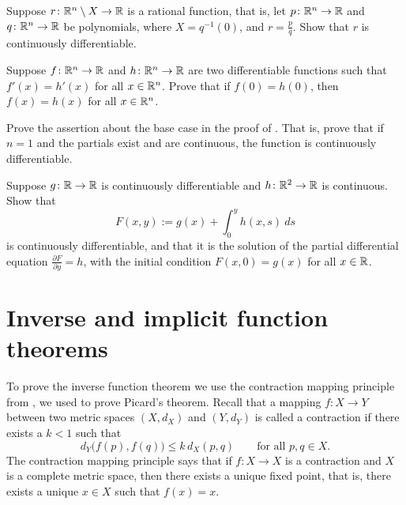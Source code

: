 \begin{exercise}
Suppose $r \colon {\mathbb{R}}^n \setminus X \to {\mathbb{R}}$ is a rational function, that is,
let $p \colon {\mathbb{R}}^n \to {\mathbb{R}}$ and
$q \colon {\mathbb{R}}^n \to {\mathbb{R}}$ be polynomials, where $X = q^{-1}(0)$, and
$r = \frac{p}{q}$.
Show that $r$ is continuously differentiable.
\end{exercise}

\begin{exercise}
Suppose $f \colon {\mathbb{R}}^n \to {\mathbb{R}}$ and $h \colon {\mathbb{R}}^n \to {\mathbb{R}}$ are two 
differentiable functions such that $f'(x) = h'(x)$ for all $x \in {\mathbb{R}}^n$.
Prove that
if $f(0) = h(0)$, then $f(x) = h(x)$ for all $x \in {\mathbb{R}}^n$.
\end{exercise}

\begin{exercise}
Prove the assertion about the base case
in the proof of .  That is, prove that
if $n=1$ and 
the partials exist and are continuous, the function is continuously
differentiable.
\end{exercise}

\begin{exercise}
Suppose $g \colon {\mathbb{R}} \to {\mathbb{R}}$ is continuously differentiable and
$h \colon {\mathbb{R}}^2 \to {\mathbb{R}}$ is continuous.  Show that
\begin{equation*}
F(x,y) := g(x) + \int_0^y h(x,s) ~ds
\end{equation*}
is continuously differentiable, and that it is the solution of 
the partial differential equation $\frac{\partial F}{\partial y} = h$,
with the initial condition $F(x,0) = g(x)$ for all $x \in {\mathbb{R}}$.
\end{exercise}



\sectionnewpage
\section{Inverse and implicit function theorems}
\label{sec:svinvfuncthm}


To prove the inverse function theorem we use the contraction mapping
principle from
,
we used
to prove Picard's theorem.
Recall that a mapping $f \colon X \to Y$ between two metric
spaces $(X,d_X)$ and $(Y,d_Y)$ is called a contraction 
if there exists a $k < 1$ such that
\begin{equation*}
d_Y\bigl(f(p),f(q)\bigr) \leq k \, d_X(p,q)
\qquad \text{for all } p,q \in X.
\end{equation*}
The contraction mapping principle says that if $f \colon X \to X$
is a contraction and $X$ is a complete metric space,
then there exists a unique fixed point, that is,
there exists a unique $x \in X$ such that $f(x) = x$.

